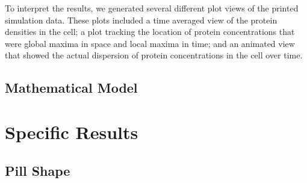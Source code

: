 \documentclass[letterpaper,twocolumn,amsmath,amssymb,pre]{revtex4-1}
\begin{document}
To interpret the results, we generated several different plot views of
the printed simulation data. These plots included a time averaged view
of the protein densities in the cell; a plot tracking the location of
protein concentrations that were global maxima in space and local maxima in
time; and an animated view that showed the actual dispersion of
protein concentrations in the cell over time.
\subsection{Mathematical Model}
\section{Specific Results}
\subsection{Pill Shape}



\end{document}
